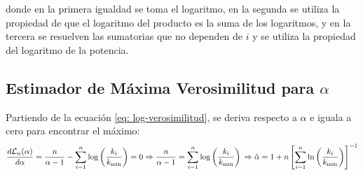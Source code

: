 \documentclass{article}
\begin{document}
donde en la primera igualdad se toma el logaritmo, en la segunda se utiliza la propiedad de que el logaritmo del producto es la suma de los logaritmos, y en la tercera se resuelven las sumatorias que no dependen de $i$ y se utiliza la propiedad del logaritmo de la potencia.

\subsection{Estimador de Máxima Verosimilitud para $\alpha$}

Partiendo de la ecuación \ref{eq: log-verosimilitud}, se deriva respecto a $\alpha$ e iguala a cero para encontrar el máximo:
$$
    \frac{d\mathcal{L}_n(\alpha)}{d\alpha} = \frac{n}{\alpha -1} - \sum_{i=1}^n \log \left(\frac{k_i}{k_\text{min}}\right) = 0 \\
    \Rightarrow \frac{n}{\alpha -1} = \sum_{i=1}^n \log \left(\frac{k_i}{k_\text{min}}\right) \\
    \Rightarrow \hat{\alpha} = 1 + n \left[ \sum_{i=1}^{n} \ln\left(\frac{k_i}{k_\text{min}}\right) \right]^{-1}
$$
\end{document}
